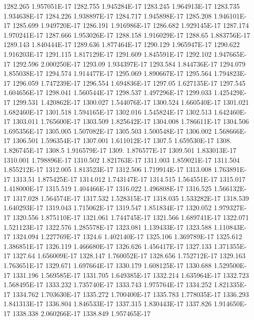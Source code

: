 1282.265  1.957051E-17
1282.755  1.945284E-17
1283.245  1.964913E-17
1283.735  1.934638E-17
1284.226  1.938897E-17
1284.717  1.945898E-17
1285.208  1.946101E-17
1285.699  1.949720E-17
1286.191  1.916986E-17
1286.682  1.929145E-17
1287.174  1.970241E-17
1287.666  1.953026E-17
1288.158  1.916029E-17
1288.65  1.883756E-17
1289.143  1.840444E-17
1289.636  1.877464E-17
1290.129  1.965947E-17
1290.622  1.916203E-17
1291.115  1.817129E-17
1291.609  1.845591E-17
1292.102  1.947665E-17
1292.596  2.000250E-17
1293.09  1.934397E-17
1293.584  1.844736E-17
1294.079  1.855038E-17
1294.574  1.914477E-17
1295.069  1.890667E-17
1295.564  1.794823E-17
1296.059  1.747239E-17
1296.554  1.694836E-17
1297.05  1.627135E-17
1297.545  1.604656E-17
1298.041  1.560544E-17
1298.537  1.497296E-17
1299.033  1.425429E-17
1299.531  1.420862E-17
1300.027  1.544076E-17
1300.524  1.660540E-17
1301.021  1.682460E-17
1301.518  1.594165E-17
1302.016  1.545824E-17
1302.513  1.642460E-17
1303.011  1.765600E-17
1303.509  1.825642E-17
1304.008  1.786611E-17
1304.506  1.695356E-17
1305.005  1.507082E-17
1305.503  1.500548E-17
1306.002  1.568666E-17
1306.501  1.596354E-17
1307.001  1.611012E-17
1307.5  1.659530E-17
1308.  1.826745E-17
1308.5  1.916579E-17
1309.  1.876577E-17
1309.501  1.833013E-17
1310.001  1.798896E-17
1310.502  1.821763E-17
1311.003  1.859021E-17
1311.504  1.855212E-17
1312.005  1.813523E-17
1312.506  1.719914E-17
1313.008  1.763891E-17
1313.51  1.875425E-17
1314.012  1.743147E-17
1314.515  1.564551E-17
1315.017  1.418000E-17
1315.519  1.404466E-17
1316.022  1.496808E-17
1316.525  1.566132E-17
1317.028  1.564574E-17
1317.532  1.528315E-17
1318.035  1.533282E-17
1318.539  1.640293E-17
1319.043  1.715062E-17
1319.547  1.851834E-17
1320.052  1.979327E-17
1320.556  1.875110E-17
1321.061  1.744745E-17
1321.566  1.689741E-17
1322.071  1.521123E-17
1322.576  1.285578E-17
1323.081  1.139433E-17
1323.588  1.110843E-17
1324.094  1.227769E-17
1324.6  1.402140E-17
1325.106  1.369789E-17
1325.612  1.386851E-17
1326.119  1.466680E-17
1326.626  1.456417E-17
1327.133  1.371355E-17
1327.64  1.656009E-17
1328.147  1.760052E-17
1328.656  1.752712E-17
1329.163  1.763651E-17
1329.671  1.697664E-17
1330.179  1.608125E-17
1330.688  1.529500E-17
1331.196  1.569585E-17
1331.705  1.649385E-17
1332.214  1.635964E-17
1332.723  1.568495E-17
1333.232  1.735740E-17
1333.743  1.975764E-17
1334.252  1.821335E-17
1334.762  1.703630E-17
1335.272  1.700400E-17
1335.783  1.778035E-17
1336.293  1.841313E-17
1336.804  1.846533E-17
1337.315  1.830443E-17
1337.826  1.914650E-17
1338.338  2.060266E-17
1338.849  1.957465E-17
